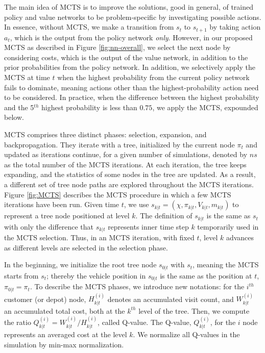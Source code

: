 \documentclass{article}
\begin{document}
The main idea of MCTS is to improve the solutions, good in general, of trained policy and value networks to be problem-specific by investigating possible actions.
In essence, without MCTS, we make a transition from $s_t$ to $s_{t+1}$ by taking action $a_t$, which is the output from the policy network \textit{only}. However, in our proposed MCTS as described in Figure \ref{fig:nn-overall}, we select the next node by considering costs, which is the output of the value network, in addition to the prior probabilities from the policy network. In addition, we selectively apply the MCTS at time $t$ when the highest probability from the current policy network fails to dominate, meaning actions other than the highest-probability action need to be considered. In practice, when the difference between the highest probability and the 5$^{th}$ highest probability is less than $0.75$, we apply the MCTS, expounded below.

MCTS comprises three distinct phases: selection, expansion, and backpropagation. They iterate with a tree, initialized by the current node $\pi_t$ and updated as iterations continue, for a given number of simulations, denoted by $ns$ as the total number of the MCTS iterations. At each iteration, the tree keeps expanding, and the statistics of some nodes in the tree are updated. As a result, a different set of tree node paths are explored throughout the MCTS iterations.
Figure \ref{fig:MCTS} describes the MCTS procedure in which a few MCTS iterations have been run. Given time $t$, we use $s_{k|t}=(\chi, \pi_{k|t}, V_{k|t}, m_{k|t})$ to represent a tree node positioned at level $k$. The definition of $s_{k|t}$ is the same as $s_t$ with only the difference that $s_{k|t}$ represents inner time step $k$ temporarily used in the MCTS selection. Thus, in an MCTS iteration, with fixed $t$, level $k$ advances as different levels are selected in the selection phase.

In the beginning, we initialize the root tree node $s_{0|t}$ with $s_t$, meaning the MCTS starts from $s_t$; thereby the vehicle position in $s_{0|t}$ is the same as the position at $t$, $\pi_{0|t}=\pi_t$. To describe the MCTS phases, we introduce new notations: for the $i^{th}$ customer (or depot) node, $H^{(i)}_{k|t}$ denotes an accumulated visit count, and $W^{(i)}_{k|t}$ an accumulated total cost, both at the $k^{th}$ level of the tree. Then, we compute the ratio $Q^{(i)}_{k|t} = {W^{(i)}_{k|t}}/{H^{(i)}_{k|t}}$, called Q-value. The Q-value, $Q^{(i)}_{k|t}$, for the $i$ node represents an averaged cost at the level $k$. We normalize all Q-values in the simulation by min-max normalization.
\end{document}
